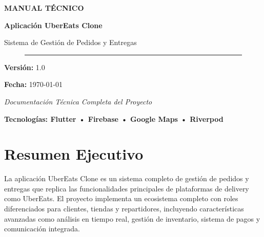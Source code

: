 \documentclass[12pt,a4paper]{article}
\begin{document}
\begin{titlepage}
    \centering
    \vspace*{2cm}
    
    {\Huge\textbf{\textcolor{primaryblue}{MANUAL TÉCNICO}}}
    
    \vspace{1cm}
    
    {\LARGE\textbf{Aplicación UberEats Clone}}
    
    \vspace{1cm}
    
    {\Large Sistema de Gestión de Pedidos y Entregas}
    
    \vspace{2cm}
    
    \begin{figure}[H]
        \centering
        \textcolor{primaryblue}{\rule{8cm}{0.5pt}}
    \end{figure}
    
    \vspace{2cm}
    
    {\large\textbf{Versión:} 1.0}
    
    \vspace{0.5cm}
    
    {\large\textbf{Fecha:} \today}
    
    \vspace{2cm}
    
    {\large\textit{Documentación Técnica Completa del Proyecto}}
    
    \vfill
    
    {\large\textcolor{primaryblue}{\textbf{Tecnologías: Flutter • Firebase • Google Maps • Riverpod}}}
    
\end{titlepage}

\tableofcontents
\newpage

\section{Resumen Ejecutivo}

La aplicación UberEats Clone es un sistema completo de gestión de pedidos y entregas que replica las funcionalidades principales de plataformas de delivery como UberEats. El proyecto implementa un ecosistema completo con roles diferenciados para clientes, tiendas y repartidores, incluyendo características avanzadas como análisis en tiempo real, gestión de inventario, sistema de pagos y comunicación integrada.
\end{document}
